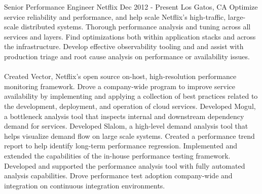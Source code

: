 \documentclass[]{mspier-cv}
\begin{document}
\experienceitem
  {Senior Performance Engineer}
  {Netflix}
  {Dec 2012 - Present}
  {Los Gatos, CA}
  {Optimize service reliability and performance, and help scale Netflix's high-traffic, large-scale distributed systems. Thorough performance analysis and tuning across all services and layers. Find optimizations both within application stacks and across the infrastructure. Develop effective observability tooling and and assist with production triage and root cause analysis on performance or availability issues.\\\\
  Created Vector, Netflix's open source on-host, high-resolution performance monitoring framework. Drove a company-wide program to improve service availability by implementing and applying a collection of best practices related to the development, deployment, and operation of cloud services. Developed Mogul, a bottleneck analysis tool that inspects internal and downstream dependency demand for services. Developed Slalom, a high-level demand analysis tool that helps visualize demand flow on large scale systems. Created a performance trend report to help identify long-term performance regression. Implemented and extended the capabilities of the in-house performance testing framework. Developed and supported the performance analysis tool with fully automated analysis capabilities. Drove performance test adoption company-wide and integration on continuous integration environments.\\}
\end{document}
